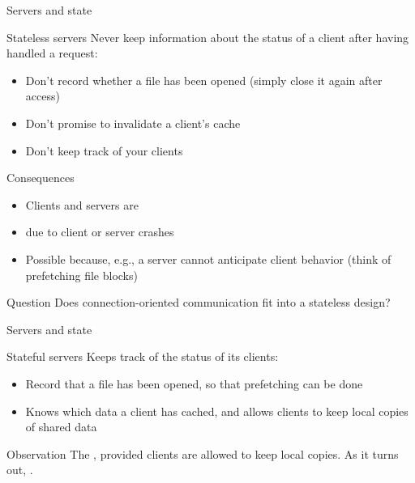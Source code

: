 \begin{slide}{Servers and state}
  \begin{block}{Stateless servers}
    Never keep  information about the status of a client after having handled a request:
    \begin{itemize}\tightlist
    \item Don't record whether a file has been opened (simply close it again after access)
    \item Don't promise to invalidate a client's cache
    \item Don't keep track of your clients
    \end{itemize}
  \end{block}
  \onslide
  \begin{block}{Consequences}
    \begin{itemize}\tightlist
    \item Clients and servers are 
    \item {} due to client or server crashes 
    \item Possible  because, e.g., a server cannot anticipate client behavior (think of
      prefetching file blocks)
    \end{itemize}
  \end{block}
  \onslide
  \begin{alertblock}{Question}
    Does connection-oriented communication fit into a stateless design?
  \end{alertblock}
\end{slide}
\begin{slide}{Servers and state}
  \begin{block}{Stateful servers}
    Keeps track of the status of its clients:
    \begin{itemize}\tightlist
    \item Record that a file has been opened, so that prefetching can be done
    \item Knows which data a client has cached, and allows clients to keep local copies of shared data
    \end{itemize}
  \end{block}
  \onslide
  \begin{alertblock}{Observation} 
    The , provided clients are allowed to keep
    local copies. As it turns out, .
  \end{alertblock}
\end{slide}
